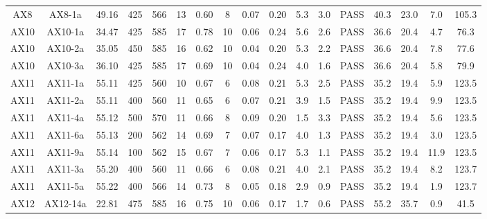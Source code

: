 \documentclass[9pt,twoside,lineno]{pnas-new}
\begin{document}
\begin{table}
\begin{tabular}{ccccccccccccccccc}
AX8  & AX8-1a   & 49.16     & 425       & 566       & 13 & 0.60 & 8     & 0.07    & 0.20    & 5.3            & 3.0             & PASS & 40.3       & 23.0          & 7.0      & 105.3         \\
AX10 & AX10-1a  & 34.47     & 425       & 585       & 17 & 0.78 & 10    & 0.06    & 0.24    & 5.6            & 2.6             & PASS & 36.6       & 20.4          & 4.7      & 76.3          \\
AX10 & AX10-2a  & 35.05     & 450       & 585       & 16 & 0.62 & 10    & 0.04    & 0.20    & 5.3            & 2.2             & PASS & 36.6       & 20.4          & 7.8      & 77.6          \\
AX10 & AX10-3a  & 36.10     & 425       & 585       & 17 & 0.69 & 10    & 0.04    & 0.24    & 4.0            & 1.6             & PASS & 36.6       & 20.4          & 5.8      & 79.9          \\
AX11 & AX11-1a  & 55.11     & 425       & 560       & 10 & 0.67 & 6     & 0.08    & 0.21    & 5.3            & 2.5             & PASS & 35.2       & 19.4          & 5.9      & 123.5         \\
AX11 & AX11-2a  & 55.11     & 400       & 560       & 11 & 0.65 & 6     & 0.07    & 0.21    & 3.9            & 1.5             & PASS & 35.2       & 19.4          & 9.9      & 123.5         \\
AX11 & AX11-4a  & 55.12     & 500       & 570       & 11 & 0.66 & 8     & 0.09    & 0.20    & 1.5            & 3.3             & PASS & 35.2       & 19.4          & 5.6      & 123.5         \\
AX11 & AX11-6a  & 55.13     & 200       & 562       & 14 & 0.69 & 7     & 0.07    & 0.17    & 4.0            & 1.3             & PASS & 35.2       & 19.4          & 3.0      & 123.5         \\
AX11 & AX11-9a  & 55.14     & 100       & 562       & 15 & 0.67 & 7     & 0.06    & 0.17    & 5.3            & 1.1             & PASS & 35.2       & 19.4          & 11.9     & 123.5         \\
AX11 & AX11-3a  & 55.20     & 400       & 560       & 11 & 0.66 & 6     & 0.08    & 0.21    & 4.0            & 2.1             & PASS & 35.2       & 19.4          & 8.2      & 123.7         \\
AX11 & AX11-5a  & 55.22     & 400       & 566       & 14 & 0.73 & 8     & 0.05    & 0.18    & 2.9            & 0.9             & PASS & 35.2       & 19.4          & 1.9      & 123.7         \\
AX12 & AX12-14a & 22.81     & 475       & 585       & 16 & 0.75 & 10    & 0.06    & 0.17    & 1.7            & 0.6             & PASS & 55.2       & 35.7          & 0.9      & 41.5          \\

\end{tabular}
\end{table}
\end{document}
